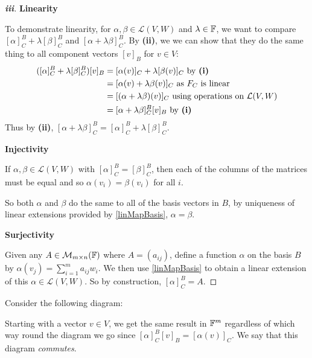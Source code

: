 \documentclass[../main.tex]{subfiles}
\begin{document}
\begin{proof}[\textbf{iii}]\par
  \textbf{Linearity}\par
  To demonstrate linearity, for $\alpha, \beta \in \mathcal{L}(V, W)$ and $\lambda \in \mathbb{F}$, we want to compare $[\alpha]^{B}_{C} + \lambda [\beta]^{B}_{C}$ and $[\alpha + \lambda \beta]^{B}_{C}$.
  By \textbf{(ii)}, we we can show that they do the same thing to all component vectors $[v]_B$ for $v \in V$:
  \begin{align*}
    ([\alpha]^{B}_{C} + \lambda [\beta]^{B}_{C}) [v]_{B} &= [\alpha(v)]_{C} + \lambda [\beta(v)]_{C} \text{ by \textbf{(i)}} \\
                                                         &= [\alpha(v) + \lambda \beta(v)]_C \text{ as $F_C$ is linear} \\
                                                         &= [(\alpha + \lambda \beta)(v)]_{C} \text{ using operations on $\mathcal{L}(V, W)$}\\
                                                         &= [\alpha + \lambda \beta]^{B}_{C} [v]_B \text{ by \textbf{(i)}}
  \end{align*}
  Thus by \textbf{(ii)}, $[\alpha + \lambda \beta]^{B}_{C} = [\alpha]^{B}_{C} + \lambda [\beta]^{B}_{C}$.

  \textbf{Injectivity}\par
  If $\alpha, \beta \in \mathcal{L}(V, W)$ with $[\alpha]^{B}_{C} = [\beta]^{B}_{C}$, then each of the columns of the matrices must be equal and so $\alpha(v_i) = \beta(v_i)$ for all $i$.

  So both $\alpha$ and $\beta$ do the same to all of the basis vectors in $B$, by uniqueness of linear extensions provided by \cref{linMapBasis}, $\alpha = \beta$.

  \textbf{Surjectivity}\par
  Given any $A \in \mathcal{M}_{m \times n}(\mathbb{F})$ where $A = (a_{i j})$, define a function $\alpha$ on the basis $B$ by $\alpha(v_j) = \sum_{i = 1}^{m} a_{i j}w_i$.
  We then use \cref{linMapBasis} to obtain a linear extension of this $\alpha \in \mathcal{L}(V, W)$.
  So by construction, $[\alpha]^{B}_{C} = A$.
\end{proof}
\begin{remark}
  Consider the following diagram:
  \begin{center}
  \end{center}
Starting with a vector $v \in V$, we get the same result in $\mathbb{F}^m$ regardless of which way round the diagram we go since $[\alpha]^{B}_{C}[v]_B = [\alpha(v)]_{C}$.
We say that this diagram \textit{commutes}.
\end{remark}
\end{document}
